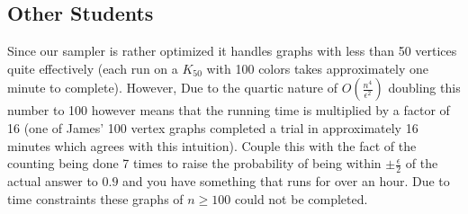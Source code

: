 \documentclass[14]{article}
\begin{document}
\subsection{Other Students}
Since our sampler is rather optimized it handles graphs with less than 50 vertices quite effectively (each run on a $K_{50}$ with 100 colors takes approximately one minute to complete). However, Due to the quartic nature of $O(\frac{n^4}{\epsilon^2})$ doubling this number to 100 however means that the running time is multiplied by a factor of 16 (one of James' 100 vertex graphs completed a trial in approximately 16 minutes which agrees with this intuition). Couple this with the fact of the counting being done 7 times to raise the probability of being within $\pm \frac{\epsilon}{2}$ of the actual answer to $0.9$ and you have something that runs for over an hour. Due to time constraints these graphs of $n \geq 100$ could not be completed.
\end{document}
